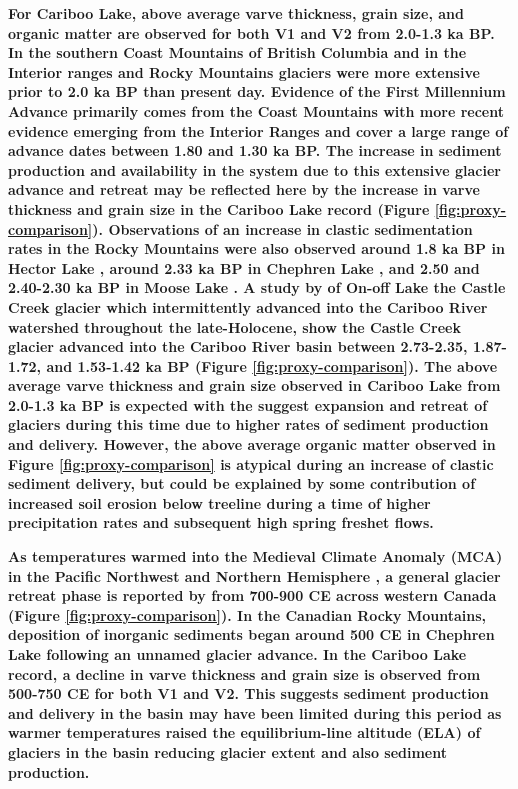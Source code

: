 \documentclass[Royal,times,doublespace,sageh]{sagej}
\begin{document}
\textbf{For Cariboo Lake, above average varve thickness, grain size, and
organic matter are observed for both V1 and V2 from 2.0-1.3 ka BP. In
the southern Coast Mountains of British Columbia
\citep{Koch2007a, Osborn2007, Allen2007, Clague2010} and in the Interior
ranges and Rocky Mountains \citep{Luckman1993, Luckman1995} glaciers
were more extensive prior to 2.0 ka BP than present day. Evidence of the
First Millennium Advance primarily comes from the Coast Mountains
\citep{Reyes2006, Osborn2007} with more recent evidence emerging from
the Interior Ranges \citep{Maurer2012b} and cover a large range of
advance dates between 1.80 and 1.30 ka BP. The increase in sediment
production and availability in the system due to this extensive glacier
advance and retreat may be reflected here by the increase in varve
thickness and grain size in the Cariboo Lake record (Figure
\ref{fig:proxy-comparison}). Observations of an increase in clastic
sedimentation rates in the Rocky Mountains were also observed around 1.8
ka BP in Hector Lake \citep{Leonard1997}, around 2.33 ka BP in Chephren
Lake \citep{Dirszowsky1997a}, and 2.50 and 2.40-2.30 ka BP in Moose Lake
\citep{Desloges1999}. A study by \citet{Maurer2012b} of On-off Lake the
Castle Creek glacier which intermittently advanced into the Cariboo
River watershed throughout the late-Holocene, show the Castle Creek
glacier advanced into the Cariboo River basin between 2.73-2.35,
1.87-1.72, and 1.53-1.42 ka BP (Figure \ref{fig:proxy-comparison}). The
above average varve thickness and grain size observed in Cariboo Lake
from 2.0-1.3 ka BP is expected with the suggest expansion and retreat of
glaciers during this time due to higher rates of sediment production and
delivery. However, the above average organic matter observed in Figure
\ref{fig:proxy-comparison} is atypical during an increase of clastic
sediment delivery, but could be explained by some contribution of
increased soil erosion below treeline during a time of higher
precipitation rates and subsequent high spring freshet flows.}

\textbf{As temperatures warmed into the Medieval Climate Anomaly (MCA)
in the Pacific Northwest \citep{Steinman2012} and Northern Hemisphere
\citep{Moberg2005}, a general glacier retreat phase is reported by
\citet{Solomina2016} from 700-900 CE across western Canada (Figure
\ref{fig:proxy-comparison}). In the Canadian Rocky Mountains, deposition
of inorganic sediments began around 500 CE in Chephren Lake
\citep{Dirszowsky1997a} following an unnamed glacier advance. In the
Cariboo Lake record, a decline in varve thickness and grain size is
observed from 500-750 CE for both V1 and V2. This suggests sediment
production and delivery in the basin may have been limited during this
period as warmer temperatures raised the equilibrium-line altitude (ELA)
of glaciers in the basin reducing glacier extent and also sediment
production.}
\end{document}
